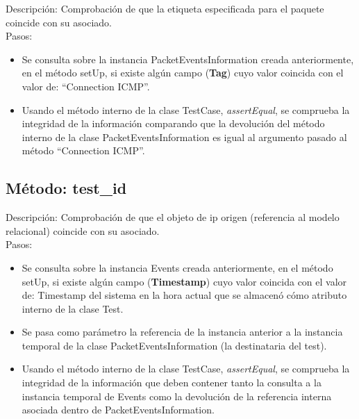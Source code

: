Descripción: Comprobación de que la etiqueta especificada para el paquete coincide con su asociado.\\
Pasos:
\begin{itemize}
\item Se consulta sobre la instancia PacketEventsInformation creada anteriormente, en el método setUp, si existe algún campo (\textbf{Tag}) cuyo valor coincida con el valor de: ``Connection ICMP''.
\item Usando el método interno de la clase TestCase, \emph{assertEqual}, se comprueba la integridad de la información comparando que la devolución del método interno de la clase PacketEventsInformation es igual al argumento pasado al método ``Connection ICMP''.
\end{itemize}



\subsection{Método: test\_id}

Descripción: Comprobación de que el objeto de ip origen (referencia al modelo relacional) coincide con su asociado.\\
Pasos:
\begin{itemize}
\item Se consulta sobre la instancia Events creada anteriormente, en el método setUp, si existe algún campo (\textbf{Timestamp}) cuyo valor coincida con el valor de: Timestamp del sistema en la hora actual que se almacenó cómo atributo interno de la clase Test.
\item Se pasa como parámetro la referencia de la instancia anterior a la instancia temporal de la clase PacketEventsInformation (la destinataria del test).
\item Usando el método interno de la clase TestCase, \emph{assertEqual}, se comprueba la integridad de la información que deben contener tanto la consulta a la instancia temporal de Events como la devolución de la referencia interna asociada dentro de PacketEventsInformation.
\end{itemize}


